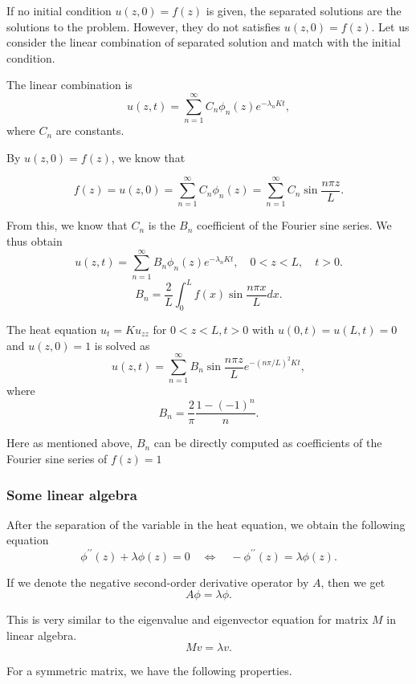 If no initial condition $u(z, 0) = f(z)$ is given, the separated solutions are the solutions to the problem. However, they do not satisfies $u(z, 0) = f(z)$.
Let us consider the linear combination of separated solution and match with the initial condition.

The linear combination is 
$$
u(z, t)=\sum_{n=1}^{\infty} C_n \phi_n(z) e^{-\lambda_n K t},
$$
where $C_n$ are constants. 

By $u(z, 0) = f(z)$, we know that 

$$
f(z) = u(z, 0) = \sum_{n=1}^{\infty} C_n \phi_n(z) = \sum_{n=1}^{\infty} C_n \sin \frac{n\pi z}{L}.
$$

From this, we know that $C_n$ is the $B_n$ coefficient of the Fourier sine series. We thus obtain
$$
u(z, t)=\sum_{n=1}^{\infty} B_n \phi_n(z) e^{-\lambda_n K t}, \quad 0<z<L, \quad t>0 .
$$
$$
B_n=\frac{2}{L} \int_0^L f(x) \sin \frac{n \pi x}{L} d x.
$$

\begin{example}[]
The heat equation $u_t=K u_{z z}$ for $0<z<L, t>0$ with $u(0, t)=u(L, t)=0$ and $u(z, 0)=1$ is solved as
$$
u(z, t)=\sum_{n=1}^{\infty} B_n \sin \frac{n \pi z}{L} e^{-(n \pi / L)^2 K t},
$$
where  
$$
B_n=\frac{2}{\pi} \frac{1-(-1)^n}{n} .
$$

Here as mentioned above, $B_n$ can be directly computed as coefficients of the Fourier sine series of $f(z) = 1$
\end{example}

\subsubsection{Some linear algebra}

After the separation of the variable in the heat equation, we obtain the following equation
$$
\phi^{\prime \prime}(z)+\lambda \phi(z)=0 \quad \Leftrightarrow \quad -\phi^{\prime \prime}(z) = \lambda \phi(z).
$$

If we denote the negative second-order derivative operator by $A$, then we get
$$
A\phi = \lambda\phi.
$$ 

This is very similar to the eigenvalue and eigenvector equation for matrix $M$ in linear algebra.
\begin{equation}\label{eq.eigenvalue_linear_alg}
    M v = \lambda v.
\end{equation}

For a symmetric matrix, we have the following properties.

